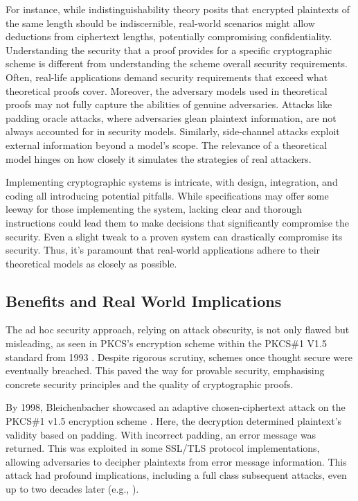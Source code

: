 \documentclass[]{final_report}
\theoremstyle{definition}
\begin{document}
For instance, while indistinguishability theory posits that encrypted plaintexts of the same length should be indiscernible, real-world scenarios might allow deductions from ciphertext lengths, potentially compromising confidentiality.  Understanding the security that a proof provides for a specific cryptographic scheme is different from understanding the scheme overall security requirements. Often, real-life applications demand security requirements that exceed what theoretical proofs cover. Moreover, the adversary models used in theoretical proofs may not fully capture the abilities of genuine adversaries. Attacks like padding oracle attacks, where adversaries glean plaintext information, are not always accounted for in security models. Similarly, side-channel attacks exploit external information beyond a model's scope. The relevance of a theoretical model hinges on how closely it simulates the strategies of real attackers.

Implementing cryptographic systems is intricate, with design, integration, and coding all introducing potential pitfalls. While specifications may offer some leeway for those implementing the system, lacking clear and thorough instructions could lead them to make decisions that significantly compromise the security. Even a slight tweak to a proven system can drastically compromise its security. Thus, it's paramount that real-world applications adhere to their theoretical models as closely as possible.


\subsection{Benefits and Real World Implications}
\label{provBenefits}
The ad hoc security approach, relying on attack obscurity, is not only flawed but misleading, as seen in PKCS's encryption scheme within the PKCS\#1 V1.5 standard from 1993 \cite{rfc2313}. Despite rigorous scrutiny, schemes once thought secure were eventually breached. This paved the way for provable security, emphasising concrete security principles and the quality of cryptographic proofs.

By 1998, Bleichenbacher showcased an adaptive chosen-ciphertext attack on the PKCS\#1 v1.5 encryption scheme \cite{bleichenbacher1998chosen}. Here, the decryption determined plaintext's validity based on padding. With incorrect padding, an error message was returned. This was exploited in some SSL/TLS protocol implementations, allowing adversaries to decipher plaintexts from error message information. This attack had profound implications, including a full class subsequent attacks, even up to two decades later (e.g., \cite{coppersmith1996low, coron2000new, 10.1007/978-3-540-45238-6_33, degabriele2012joint, bardou2012efficient, meyer2014revisiting, zhang2014cross, jager2015security, jager2015practical, bock2018return}).
\end{document}
